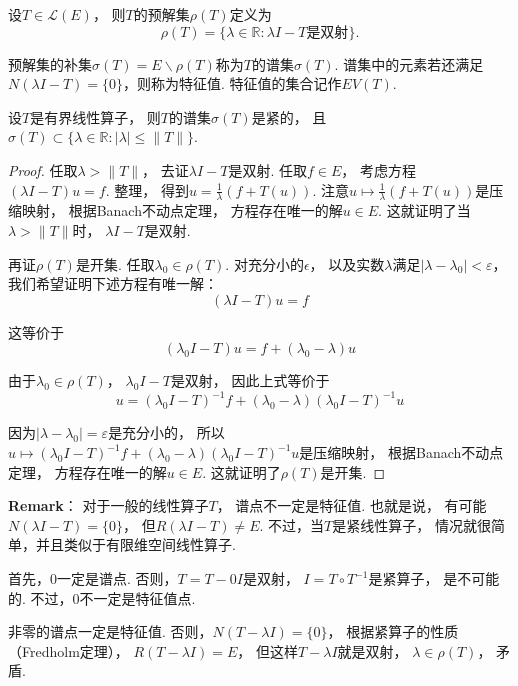 \begin{definition}[预解集]
    设$T \in \mathcal{L}(E)$，
    则$T$的预解集$\rho (T)$定义为
    \[
        \rho(T) = \{\lambda \in \mathbb{R} : \lambda I - T \text{是双射}\}.
    \]

    预解集的补集$\sigma (T) = E \backslash \rho(T)$称为$T$的谱集$\sigma(T)$.
    谱集中的元素若还满足$N(\lambda I - T) = \{0\}$，则称为特征值.
    特征值的集合记作$EV(T)$.

\end{definition}

\begin{proposition}
    设$T$是有界线性算子，
    则$T$的谱集$\sigma(T)$是紧的，
    且$\sigma(T) \subset \{ \lambda \in \mathbb{R} : |\lambda| \leq \|T\| \}$.
\end{proposition}
\begin{proof}
    任取$\lambda > \|T\|$，
    去证$\lambda I - T$是双射.
    任取$f \in E$，
    考虑方程$(\lambda I - T)u = f$.
    整理，
    得到$u = \frac{1}{\lambda}(f + T(u))$.
    注意$u \mapsto \frac{1}{\lambda}(f + T(u))$是压缩映射，
    根据Banach不动点定理，
    方程存在唯一的解$u \in E$.
    这就证明了当$\lambda > \|T\|$时，
    $\lambda I - T$是双射.

    再证$\rho (T)$是开集.
    任取$\lambda_0 \in \rho (T)$.
    对充分小的$\epsilon$，
    以及实数$\lambda$满足$|\lambda - \lambda_0| < \varepsilon$，
    我们希望证明下述方程有唯一解：
    \[
     (\lambda I - T) u = f
    \]

    这等价于
    \[
    (\lambda_0 I - T) u = f + (\lambda_0 - \lambda) u
    \]

    由于$\lambda_0 \in \rho (T)$，
    $\lambda_0 I - T$是双射，
    因此上式等价于
    \[
    u = (\lambda_0 I - T)^{-1} f + (\lambda_0 - \lambda) (\lambda_0 I - T)^{-1} u
    \]

    因为$|\lambda - \lambda_0| = \varepsilon$是充分小的，
    所以$u \mapsto (\lambda_0 I - T)^{-1} f + (\lambda_0 - \lambda) (\lambda_0 I - T)^{-1} u$是压缩映射，
    根据Banach不动点定理，
    方程存在唯一的解$u \in E$.
    这就证明了$\rho (T)$是开集.
\end{proof}

\begin{remarkbox}
    \textbf{Remark}：
    对于一般的线性算子$T$，
    谱点不一定是特征值.
    也就是说，
    有可能$N(\lambda I - T) = \{0\}$，
    但$R(\lambda I - T) \ne E$.
    不过，当$T$是紧线性算子，
    情况就很简单，并且类似于有限维空间线性算子.

    \smallskip

    首先，$0$一定是谱点.
    否则，$T = T - 0I$是双射，
    $I = T \circ T^{-1}$是紧算子，
    是不可能的.
    不过，$0$不一定是特征值点.

    \smallskip

    非零的谱点一定是特征值.
    否则，$N(T - \lambda I) = \{0\}$，
    根据紧算子的性质（Fredholm定理），
    $R(T - \lambda I) = E$，
    但这样$T - \lambda I$就是双射，
    $\lambda \in \rho (T)$，
    矛盾.
\end{remarkbox}


